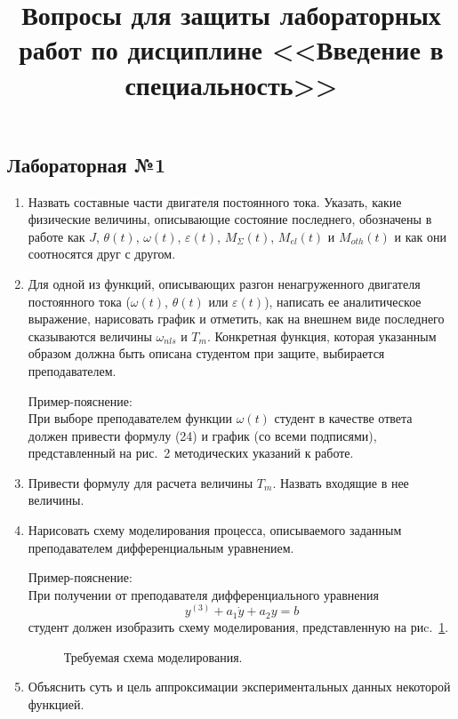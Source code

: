\documentclass[12pt,a4paper]{article}
\title{Вопросы для защиты лабораторных работ по дисциплине <<Введение в специальность>>}
\date{}
\author{}
\begin{document}
\maketitle
\thispagestyle{empty}
\pagestyle{empty}

\subsection*{Лабораторная №1}
\begin{enumerate}
\item Назвать составные части двигателя постоянного тока. Указать, какие физические величины, описывающие состояние последнего, обозначены в работе как $J$, $\theta(t)$, $\omega(t)$, $\varepsilon(t)$, $M_\Sigma(t)$, $M_{el}(t)$ и $M_{oth}(t)$ и как они соотносятся друг с другом.
\item Для одной из функций, описывающих разгон ненагруженного двигателя постоянного тока ($\omega(t)$, $\theta(t)$ или $\varepsilon(t)$), написать ее аналитическое выражение, нарисовать график и отметить, как на внешнем виде последнего сказываются величины $\omega_{nls}$ и $T_m$. Конкретная функция, которая указанным образом должна быть описана студентом при защите, выбирается преподавателем.

Пример-пояснение:\\
При выборе преподавателем функции $\omega(t)$ студент в качестве ответа должен привести формулу (24) и график (со всеми подписями), представленный на рис.~2 методических указаний к работе.
\item Привести формулу для расчета величины $T_m$. Назвать входящие в нее величины.
\item Нарисовать схему моделирования процесса, описываемого заданным преподавателем дифференциальным уравнением.

Пример-пояснение:\\
При получении от преподавателя дифференциального уравнения
$$
y^{(3)} + a_1\dot{y} + a_2y = b
$$
студент должен изобразить схему моделирования, представленную на риc.~\ref{fig:modeling_scheme}.
\begin{figure}[h]
	\noindent{}
	\caption{Требуемая схема моделирования.}
	\label{fig:modeling_scheme}
\end{figure}
\item Объяснить суть и цель аппроксимации экспериментальных данных некоторой функцией.
\end{enumerate}
\end{document}
